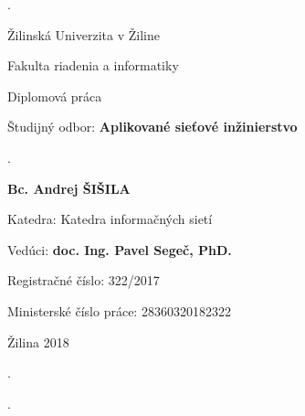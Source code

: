 \begin{titlepage}

\phantom.

\bigskip

\begin{center}
{\sc\LARGE Žilinská Univerzita v Žiline}

\medskip

{\sc\Large Fakulta riadenia a informatiky}

\vfill\vfill\vfill\vfill

\bigskip
\bigskip

{\sc\LARGE Diplomová práca}

\medskip

{\large Študijný odbor: {\bf Aplikované sieťové inžinierstvo}}
\end{center}


\vfill\vfill\vfill\vfill


\phantom.\hfill
\begin{center}

{\large\bf \nazovpraceSK}

\bigskip

{\large\bf Bc. Andrej ŠIŠILA}

\bigskip
\bigskip

Katedra: Katedra informačných sietí

\medskip

Vedúci: {\bf doc. Ing. Pavel Segeč, PhD.}

\bigskip
\bigskip

Registračné číslo: 322/2017

\medskip

Ministerské číslo práce: 28360320182322

\medskip

Žilina 2018

\end{center}
\hspace{1.7cm}\phantom.

\vspace{2.9cm}

\phantom.
\end{titlepage}